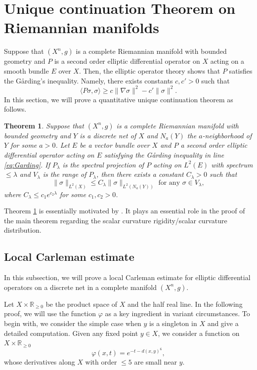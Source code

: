 \documentclass[12pt, reqno]{amsart}
\theoremstyle{plain}%
\newtheorem{theorem}{Theorem}[section]
\theoremstyle{definition}
\theoremstyle{remark}
\numberwithin{equation}{section}
\newcommand{\R}{\mathbb{R}}
\begin{document}
\section{Unique continuation Theorem  on Riemannian manifolds} \label{sec: unique_cont.}


Suppose that $(X^n, g)$ is  a complete Riemannian manifold with bounded geometry and 
$P$ is a second order elliptic differential operator on $X$ acting on a smooth bundle $E$ over $X$. Then, the elliptic operator theory shows that $P$ satisfies the G\r{a}rding's inequality. Namely, there exists constants $c,c'>0$ such that
\begin{equation}\label{eq:Garding}
	\langle P\sigma,\sigma\rangle\geq c\|\nabla \sigma\|^2-c'\|\sigma\|^2.
\end{equation}
 In this section, we will prove a quantitative unique continuation theorem as follows.

\begin{theorem}\label{thm:uniqueCont}
Suppose that $(X^n, g)$ is a complete Riemannian manifold with bounded geometry and   $Y$ is a discrete net of $X$ and $N_a(Y)$ the $a$-neighborhood of $Y$ for some $a>0$.  Let $E$ be a vector bundle over $X$ and $P$ a second order elliptic differential operator acting on $E$ satisfying the G\r{a}rding inequality  in line \eqref{eq:Garding}. If  $P_\lambda$ is the spectral projection of $P$ acting on $L^2(E)$ with spectrum $\leq \lambda$ and $V_\lambda$ is the range of $P_\lambda$, then there exists a constant $C_\lambda>0$ such that
	$$\|\sigma\|_{L^2(X)}\leq C_\lambda\|\sigma\|_{L^2(N_a(Y))}\text{ for any }\sigma\in V_\lambda,$$
    where $C_\lambda\leq c_1e^{c_2\lambda}$ for some $c_1,c_2>0$.
\end{theorem}
Theorem \ref{thm:uniqueCont} is essentially motivated by  \cite{MR1362555,MR3041662}. It plays an essential role in the proof of the main theorem regarding the scalar curvature rigidity/scalar curvature distribution.

\subsection{Local Carleman estimate}

In this subsection, we will prove a local Carleman estimate for elliptic differential operators on a discrete net in a complete manifold $(X^n, g)$. 



Let $X\times\R_{\geq 0}$ be the product space of $X$ and the half real line. In the following proof, we will use the function $\varphi$ as a key ingredient in variant circumstances. To begin with, we consider the simple case when $y$ is a singleton in $X$ and give a detailed computation. Given any fixed point $y\in X$, we consider a function on $X\times\R_{\geq 0}$
$$\varphi(x,t)=e^{-t-d(x,y)^6},$$
whose derivatives along $X$ with order $\leq 5$ are small near $y$. 
\end{document}
